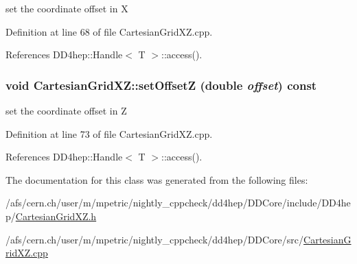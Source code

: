 set the coordinate offset in X 

Definition at line 68 of file CartesianGridXZ.cpp.

References DD4hep::Handle$<$ T $>$::access().\hypertarget{class_d_d4hep_1_1_geometry_1_1_cartesian_grid_x_z_a2cd92081fe24132f9f21865e6cebc887}{
\subsubsection[{setOffsetZ}]{\setlength{\rightskip}{0pt plus 5cm}void CartesianGridXZ::setOffsetZ (double {\em offset}) const}}
\label{class_d_d4hep_1_1_geometry_1_1_cartesian_grid_x_z_a2cd92081fe24132f9f21865e6cebc887}


set the coordinate offset in Z 

Definition at line 73 of file CartesianGridXZ.cpp.

References DD4hep::Handle$<$ T $>$::access().

The documentation for this class was generated from the following files:\begin{DoxyCompactItemize}
\item 
/afs/cern.ch/user/m/mpetric/nightly\_\-cppcheck/dd4hep/DDCore/include/DD4hep/\hyperlink{_d_d_core_2include_2_d_d4hep_2_cartesian_grid_x_z_8h}{CartesianGridXZ.h}\item 
/afs/cern.ch/user/m/mpetric/nightly\_\-cppcheck/dd4hep/DDCore/src/\hyperlink{_d_d_core_2src_2_cartesian_grid_x_z_8cpp}{CartesianGridXZ.cpp}\end{DoxyCompactItemize}
